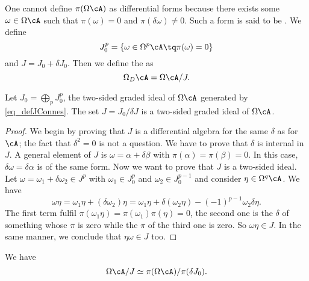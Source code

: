 One cannot define $\pi(\Omega\cA)$ as differential forms because there exists some $\omega\in\Omega\cA$ such that $\pi(\omega)=0$ and $\pi(\delta\omega)\neq 0$. Such a form is said to be . We define
\begin{equation}  \label{eq_defJConnes}
  J_0^p=\{ \omega\in\Omega^p\cA\tq \pi(\omega)=0 \}
\end{equation}
 and $J=J_0+\delta J_0$. Then we define the  as
\begin{equation}
\Omega_D\cA=\Omega\cA/J.
\end{equation}

\begin{proposition}
Let $J_0=\bigoplus_pJ_0^p$, the two-sided graded ideal of $\Omega\cA$ generated by \eqref{eq_defJConnes}.  The set $J=J_0/\delta J$ is a two-sided graded ideal of $\Omega\cA$. 
\end{proposition}

\begin{proof}
We begin by proving that $J$ is a differential algebra for the same $\delta$ as for $\cA$; the fact that $\delta^2=0$ is not a question. We have to prove that $\delta$ is internal in $J$. A general element of $J$ is $\omega=\alpha+\delta\beta$ with $\pi(\alpha)=\pi(\beta)=0$. In this case, $\delta\omega=\delta\alpha$ is of the same form. Now we want to prove that $J$ is a two-sided ideal. Let $\omega=\omega_1+\delta\omega_2\in J^p$ with $\omega_1\in J_0^p$ and $\omega_2\in J_0^{p-1}$ and consider $\eta\in\Omega^q\cA$. We have 
\[
  \omega\eta=\omega_1\eta+(\delta\omega_2)\eta
		=\omega_1\eta+\delta(\omega_2\eta)-(-1)^{p-1}\omega_2\delta\eta.
\]
The first term fulfil $\pi(\omega_1\eta)=\pi(\omega_1)\pi(\eta)=0$, the second one is the $\delta$ of something whose $\pi$ is zero  while the $\pi$ of the third one is zero. So $\omega\eta\in J$. In the same manner, we conclude that $\eta\omega\in J$ too.
\end{proof}

\begin{lemma}
We have
\begin{equation}
  \Omega\cA/J\simeq \pi(\Omega\cA)/\pi(\delta J_0).
\end{equation}
\label{lem_OCAisomppiOA}
\end{lemma}

